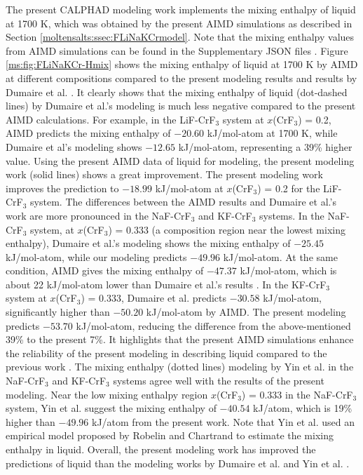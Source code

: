 The present CALPHAD modeling work implements the mixing enthalpy of liquid at 1700 K, which was obtained by the present AIMD simulations as described in Section \ref{moltensalts:ssec:FLiNaKCrmodel}. Note that the mixing enthalpy values from AIMD simulations can be found in the Supplementary JSON files \cite{gong2024revisiting}. Figure \ref{ms:fig:FLiNaKCr-Hmix} shows the mixing enthalpy of liquid at 1700 K by AIMD at different compositions compared to the present modeling results and results by Dumaire et al. \cite{dumaire2021thermodynamic}. It clearly shows that the mixing enthalpy of liquid (dot-dashed lines) by Dumaire et al.’s modeling \cite{dumaire2021thermodynamic} is much less negative compared to the present AIMD calculations. For example, in the LiF-CrF$_3$ system at $x$(CrF$_3$) = 0.2, AIMD predicts the mixing enthalpy of $-20.60$ kJ/mol-atom at 1700 K, while Dumaire et al’s modeling \cite{dumaire2021thermodynamic} shows $-12.65$ kJ/mol-atom, representing a 39\% higher value. Using the present AIMD data of liquid for modeling, the present modeling work (solid lines) shows a great improvement. The present modeling work improves the prediction to $-18.99$ kJ/mol-atom at $x$(CrF$_3$) = 0.2 for the LiF-CrF$_3$ system. The differences between the AIMD results and Dumaire et al.’s work \cite{dumaire2021thermodynamic} are more pronounced in the NaF-CrF$_3$ and KF-CrF$_3$ systems. In the NaF-CrF$_3$ system, at $x$(CrF$_3$) = 0.333 (a composition region near the lowest mixing enthalpy), Dumaire et al.’s modeling \cite{dumaire2021thermodynamic} shows the mixing enthalpy of $-25.45$ kJ/mol-atom, while our modeling predicts $-49.96$ kJ/mol-atom. At the same condition, AIMD gives the mixing enthalpy of $-47.37$ kJ/mol-atom, which is about 22 kJ/mol-atom lower than Dumaire et al.’s results \cite{dumaire2021thermodynamic}. In the KF-CrF$_3$ system at $x$(CrF$_3$) = 0.333, Dumaire et al. \cite{dumaire2021thermodynamic} predicts $-30.58$ kJ/mol-atom, significantly higher than $-50.20$ kJ/mol-atom by AIMD. The present modeling predicts $-53.70$ kJ/mol-atom, reducing the difference from the above-mentioned 39\% to the present 7\%. It highlights that the present AIMD simulations enhance the reliability of the present modeling in describing liquid compared to the previous work \cite{dumaire2021thermodynamic}. The mixing enthalpy (dotted lines) modeling by Yin et al. \cite{yin2018thermodynamic} in the NaF-CrF$_3$ and KF-CrF$_3$ systems agree well with the results of the present modeling. Near the low mixing enthalpy region $x$(CrF$_3$) = 0.333 in the NaF-CrF$_3$ system, Yin et al. \cite{yin2018thermodynamic} suggest the mixing enthalpy of $-40.54$ kJ/atom, which is 19\% higher than $-49.96$ kJ/atom from the present work. Note that Yin et al. \cite{yin2018thermodynamic} used an empirical model proposed by Robelin and Chartrand \cite{robelin2011thermodynamic} to estimate the mixing enthalpy in liquid. Overall, the present modeling work has improved the predictions of liquid than the modeling works by Dumaire et al. \cite{dumaire2021thermodynamic} and Yin et al. \cite{yin2018thermodynamic}. 


